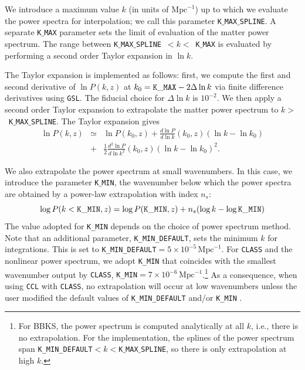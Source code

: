 \documentclass[\docopts]{\docclass}
\newcommand{\class}{{\tt CLASS}\xspace}
\begin{document}
We introduce a maximum value $k$ (in units of $\text{Mpc}^{-1}$) up to which we evaluate the power spectra for interpolation; we call this parameter {\tt K$\_$MAX$\_$SPLINE}. A separate {\tt K$\_$MAX} parameter sets the limit of evaluation of the matter power spectrum. The range between {\tt K$\_$MAX$\_$SPLINE}~$<k<$~{\tt K$\_$MAX} is evaluated by performing a second order Taylor expansion in $\ln k$.

The Taylor expansion is implemented as follows: first, we compute the first and second derivative of $\ln P(k,z)$ at $k_0={\rm \tt K\_MAX}-2\Delta\ln k$ via finite difference derivatives using {\tt GSL}. The fiducial choice for $\Delta\ln k$ is $10^{-2}$. We then apply a second order Taylor expansion to extrapolate the matter power spectrum to $k>$~{\tt K$\_$MAX$\_$SPLINE}. The Taylor expansion gives
%
\begin{eqnarray}
  \ln P(k,z) &\simeq& \ln P(k_0,z) + \frac{d\ln P}{d\ln k}(k_0,z) (\ln k-\ln k_0)  \nonumber\\
  &+& \frac{1}{2}  \frac{d^2\ln P}{d\ln k^2}(k_0,z) (\ln k-\ln k_0)^2.
  \label{eq:NLPSTaylor}
\end{eqnarray}

We also extrapolate the power spectrum at small wavenumbers. In this case, we introduce the parameter {\tt K$\_$MIN}, the wavenumber below which the power spectra are obtained by a power-law extrapolation with index $n_s$:
\begin{equation}
  \log P(k<{\tt K\_MIN},z) = \log P({\tt K\_MIN},z) + n_s (\log k-\log{\tt K\_MIN})
\end{equation}
The value adopted for {\tt K\_MIN} depends on the choice of power spectrum method. Note that an additional parameter, {\tt K\_MIN\_DEFAULT}, sets the minimum $k$ for integrations. This is set to {\tt K\_MIN\_DEFAULT}$=5\times 10^{-5}\,\text{Mpc}^{-1}$. For \class and the nonlinear power spectrum, we adopt {\tt K\_MIN} that coincides with the smallest wavenumber output by \class, {\tt K\_MIN}$=7\times 10^{-6}\,\text{Mpc}^{-1}$.\footnote{For BBKS, the power spectrum is computed analytically at all $k$, i.e., there is no extrapolation. For the \citet{1998ApJ...496..605E} implementation, the splines of the power spectrum span {\tt K\_MIN\_DEFAULT}$<k<${\tt K$\_$MAX$\_$SPLINE}, so there is only extrapolation at high $k$.} As a consequence, when using {\tt CCL} with \class, no extrapolation will occur at low wavenumbers unless the user modified the default values of {\tt K\_MIN\_DEFAULT} and/or {\tt K\_MIN} .
\end{document}
